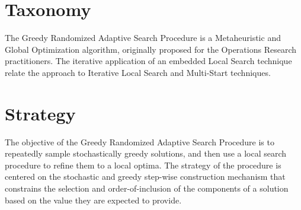 \documentclass[a4paper, 11pt]{article}
\begin{document}
\section{Taxonomy}
\label{sec:taxonomy}
The Greedy Randomized Adaptive Search Procedure is a Metaheuristic and Global Optimization algorithm, originally proposed for the Operations Research practitioners.
The iterative application of an embedded Local Search technique relate the approach to Iterative Local Search and Multi-Start techniques.

\section{Strategy}
\label{sec:strategy}
The objective of the Greedy Randomized Adaptive Search Procedure is to repeatedly sample stochastically greedy solutions, and then use a local search procedure to refine them to a local optima.
The strategy of the procedure is centered on the stochastic and greedy step-wise construction mechanism that constrains the selection and order-of-inclusion of the components of a solution based on the value they are expected to provide. 

\end{document}
